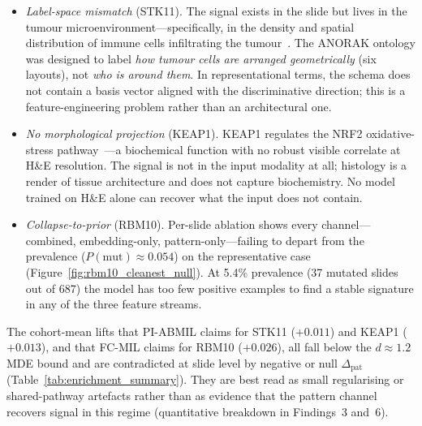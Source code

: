 \begin{itemize}
  \item \emph{Label-space mismatch} (STK11). The signal exists in
  the slide but lives in the tumour microenvironment---specifically,
  in the density and spatial distribution of immune cells
  infiltrating the
  tumour~\cite{skoulidis2018stk11pd1,pineda2025stk11morphology}.
  The ANORAK ontology was designed to label \emph{how tumour cells
  are arranged geometrically} (six layouts), not \emph{who is around
  them}.
  In representational terms, the schema does not contain a basis
  vector aligned with the discriminative direction; this is a
  feature-engineering problem rather than an architectural one.

  \item \emph{No morphological projection} (KEAP1).
  KEAP1 regulates the NRF2 oxidative-stress
  pathway~\cite{li2011keap1papillary,tcga2014luad}---a biochemical
  function with no robust visible correlate at H\&E resolution.
  The signal is not in the input modality at all; histology is a
  render of tissue architecture and does not capture biochemistry.
  No model trained on H\&E alone can recover what the input does
  not contain.

  \item \emph{Collapse-to-prior} (RBM10).
  Per-slide ablation shows every channel---combined, embedding-only,
  pattern-only---failing to depart from the prevalence
  ($P(\mathrm{mut}) \approx 0.054$) on the representative case
  (Figure~\ref{fig:rbm10_cleanest_null}).
  At 5.4\% prevalence (37 mutated slides out of 687) the model has
  too few positive examples to find a stable signature in any of
  the three feature streams.
\end{itemize}
The cohort-mean lifts that PI-ABMIL claims for STK11 ($+0.011$)
and KEAP1 ($+0.013$), and that FC-MIL claims for RBM10
($+0.026$), all fall below the $d \approx 1.2$ MDE bound and are
contradicted at slide level by negative or null
$\Delta_{\mathrm{pat}}$ (Table~\ref{tab:enrichment_summary}).
They are best read as small regularising or shared-pathway
artefacts rather than as evidence that the pattern channel
recovers signal in this regime
(quantitative breakdown in Findings~3 and~6).

